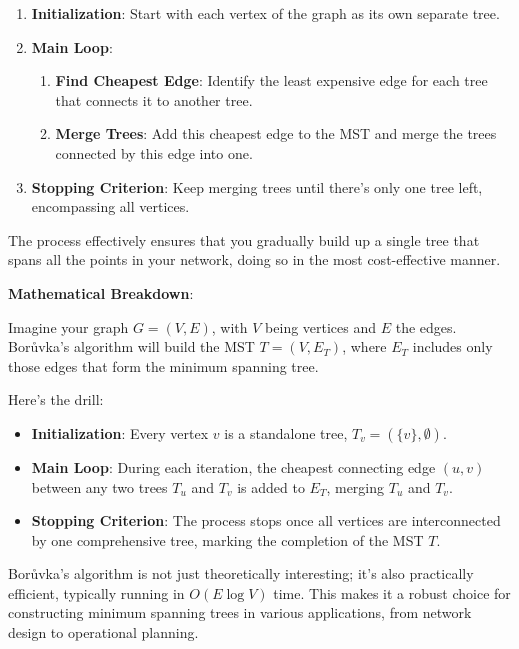 \documentclass[12pt]{book} %
\begin{document}
\begin{enumerate}
    \item \textbf{Initialization}: Start with each vertex of the graph as its own separate tree.
    
    \item \textbf{Main Loop}:
        \begin{enumerate}
            \item \textbf{Find Cheapest Edge}: Identify the least expensive edge for each tree that connects it to another tree.
            \item \textbf{Merge Trees}: Add this cheapest edge to the MST and merge the trees connected by this edge into one.
        \end{enumerate}
        
    \item \textbf{Stopping Criterion}: Keep merging trees until there’s only one tree left, encompassing all vertices.
\end{enumerate}

The process effectively ensures that you gradually build up a single tree that spans all the points in your network, doing so in the most cost-effective manner.

\textbf{Mathematical Breakdown}:

Imagine your graph \( G = (V, E) \), with \( V \) being vertices and \( E \) the edges. Borůvka’s algorithm will build the MST \( T = (V, E_T) \), where \( E_T \) includes only those edges that form the minimum spanning tree.

Here's the drill:

\begin{itemize}
    \item \textbf{Initialization}: Every vertex \( v \) is a standalone tree, \( T_v = (\{v\}, \emptyset) \).
    
    \item \textbf{Main Loop}: During each iteration, the cheapest connecting edge \( (u, v) \) between any two trees \( T_u \) and \( T_v \) is added to \( E_T \), merging \( T_u \) and \( T_v \).
    
    \item \textbf{Stopping Criterion}: The process stops once all vertices are interconnected by one comprehensive tree, marking the completion of the MST \( T \).
\end{itemize}

Borůvka’s algorithm is not just theoretically interesting; it’s also practically efficient, typically running in \( O(E \log V) \) time. This makes it a robust choice for constructing minimum spanning trees in various applications, from network design to operational planning.
\end{document}
